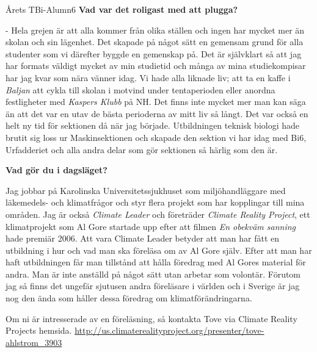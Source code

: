 \begin{news}{2}{Årets TBi-Alumn}{}{}{6}{}
\textbf{Vad var det roligast med att plugga?}

 - Hela grejen är att alla kommer från olika ställen och ingen har mycket mer än 
skolan och sin lägenhet. Det skapade på något sätt en gemensam grund för alla 
studenter som vi därefter byggde en gemenskap på. Det är självklart så att 
jag har formats väldigt mycket av min studietid och många av mina 
studiekompisar har jag kvar som nära vänner idag. Vi hade alla liknade liv; 
att ta en kaffe i \emph{Baljan} att cykla till skolan i motvind under tentaperioden 
eller anordna festligheter med \emph{Kaspers Klubb} på NH. Det finns inte mycket mer 
man kan säga än att det var en utav de bästa perioderna av mitt liv så långt. 
Det var också en helt ny tid för sektionen då när jag började. Utbildningen 
teknisk biologi hade brutit sig loss ur Maskinsektionen och skapade den 
sektion vi har idag med Bi6, Urfadderiet och alla andra delar som gör 
sektionen så härlig som den är.  


\textbf{Vad gör du i dagsläget?}

Jag jobbar på Karolinska Universitetssjukhuset som miljöhandläggare med 
läkemedels- och klimatfrågor och styr flera projekt som har kopplingar till 
mina områden. Jag är också \emph{Climate Leader} och företräder \emph{Climate 
Reality Project}, ett klimatprojekt som Al Gore startade upp efter att filmen \emph{En 
obekväm sanning} hade premiär 2006. Att vara Climate Leader betyder att 
man har fått en utbildning i hur och vad man ska föreläsa om av Al Gore 
själv. Efter att man har haft utbildningen får man tillstånd att hålla 
föredrag med Al Gores material för andra. Man är inte anställd på något sätt 
utan arbetar som volontär. Förutom jag så finns det ungefär sjutusen andra 
föreläsare i världen och i Sverige är jag nog den ända som håller dessa 
föredrag om klimatförändringarna. 

Om ni är intresserade av en föreläsning, så kontakta Tove via Climate Reality 
Projects hemsida. \url{http://us.climaterealityproject.org/presenter/tove-
ahlstrom_3903}

\end{news}
